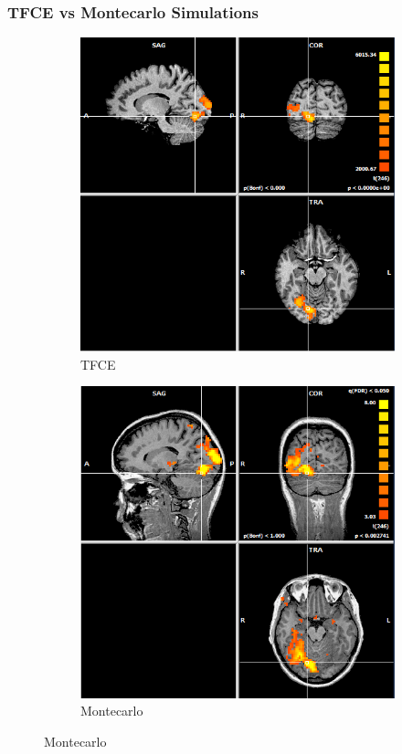 \documentclass{beamer}
\begin{document}
\begin{frame}
\frametitle{TFCE vs Montecarlo Simulations}
\begin{figure}
    \centering
    \begin{subfigure}[b]{0.48\textwidth}
        \includegraphics[width=\textwidth]{Images/Brainvoyager-TFCE83187129.png}
	\caption{TFCE}
    \end{subfigure}
    \begin{subfigure}[b]{0.48\textwidth}
        \includegraphics[width=\textwidth]{Images/Brainvoyager83187129-PluginEsposito.png}
	\caption{Montecarlo}
    \end{subfigure}
\end{figure}
\end{frame}
\end{document}
